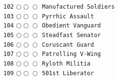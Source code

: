\documentclass[a4paper,landscape]{article}
\begin{document}
\begin{multicols*}{5}
\texttt{102} \(\bigcirc\!\bigcirc\!\bigcirc\)  \texttt{Manufactured Soldiers} \vspace{-0.3mm}\\ 
\texttt{103} \(\bigcirc\!\bigcirc\!\bigcirc\)  \texttt{Pyrrhic Assault} \vspace{-0.3mm}\\ 
\texttt{104} \(\bigcirc\!\bigcirc\!\bigcirc\)  \texttt{Obedient Vanguard} \vspace{-0.3mm}\\ 
\texttt{105} \(\bigcirc\!\bigcirc\!\bigcirc\)  \texttt{Steadfast Senator} \vspace{-0.3mm}\\ 
\texttt{106} \(\bigcirc\!\bigcirc\!\bigcirc\)  \texttt{Coruscant Guard} \vspace{-0.3mm}\\ 
\texttt{107} \(\bigcirc\!\bigcirc\!\bigcirc\)  \texttt{Patrolling V-Wing} \vspace{-0.3mm}\\ 
\texttt{108} \(\bigcirc\!\bigcirc\!\bigcirc\)  \texttt{Ryloth Militia} \vspace{-0.3mm}\\ 
\texttt{109} \(\bigcirc\!\bigcirc\!\bigcirc\)  \texttt{501st Liberator} \vspace{-0.3mm}\\ 

\end{multicols*}
\end{document}
